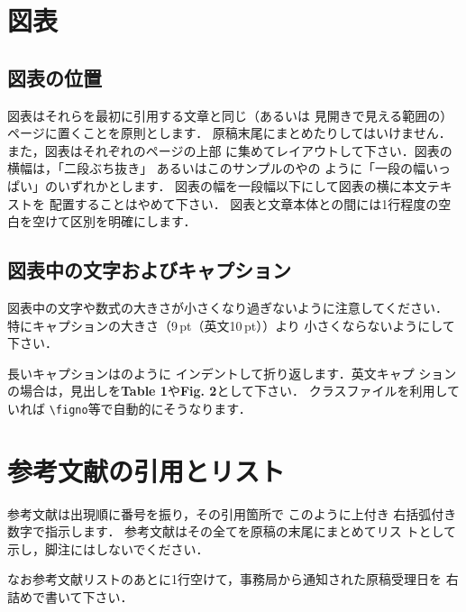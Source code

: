 \documentclass[nosetpagesize]{jsce}
\begin{document}
%

\section{図表}

\subsection{図表の位置}

図表はそれらを最初に引用する文章と同じ（あるいは
見開きで見える範囲の）ページに置くことを原則とします．
原稿末尾にまとめたりしてはいけません．
また，図表はそれぞれのページの上部
に集めてレイアウトして下さい．図表の横幅は，「二段ぶち抜き」
あるいはこのサンプルの\tabno{\ref{tab:1}}や\figno{\ref{fig:1}}の
ように「一段の幅いっぱい」のいずれかとします．
図表の幅を一段幅以下にして図表の横に本文テキストを
配置することはやめて下さい．
図表と文章本体との間には1行程度の空白を空けて区別を明確にします．

\subsection{図表中の文字およびキャプション}

図表中の文字や数式の大きさが小さくなり過ぎないように注意してください．
特にキャプションの大きさ（9\,pt（英文10\,pt））より
小さくならないようにして下さい．

長いキャプションは\tabno{\ref{tab:1}}のように
インデントして折り返します．英文キャプ
ションの場合は，見出しを{\bf Table 1}や{\bf Fig. 2}として下さい．
クラスファイルを利用していれば \verb+\figno+等で自動的にそうなります．

\section{参考文献の引用とリスト}

参考文献は出現順に番号を振り，その引用箇所で
このように\cite{1,2}上付き
右括弧付き数字で指示します．
参考文献はその全てを原稿の末尾にまとめてリス
トとして示し，脚注にはしないでください．

なお参考文献リストのあとに1行空けて，事務局から通知された原稿受理日を
右詰めで書いて下さい．
\end{document}
